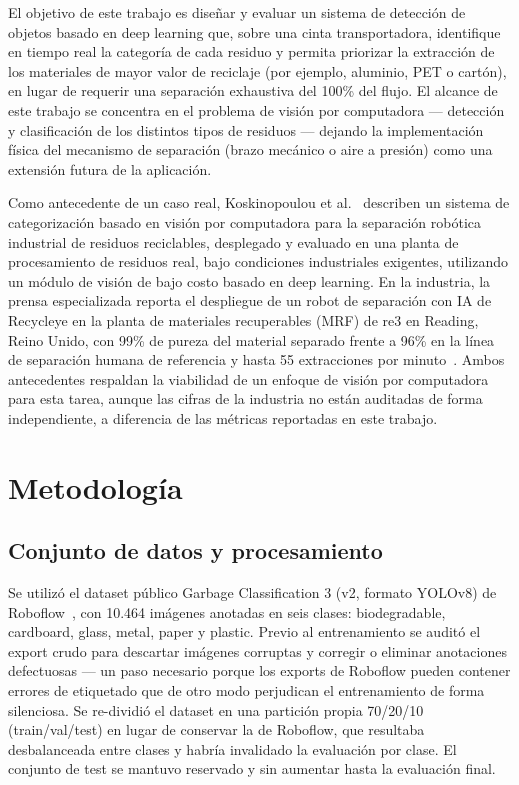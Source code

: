 \documentclass[conference]{IEEEtran}
\begin{document}
El objetivo de este trabajo es dise\~nar y evaluar un sistema de detecci\'on de objetos basado
en deep learning que, sobre una cinta transportadora, identifique en tiempo real la categor\'ia
de cada residuo y permita priorizar la extracci\'on de los materiales de mayor valor de
reciclaje (por ejemplo, aluminio, PET o cart\'on), en lugar de requerir una separaci\'on
exhaustiva del 100\% del flujo. El alcance de este trabajo se concentra en el problema de
visi\'on por computadora --- detecci\'on y clasificaci\'on de los distintos tipos de residuos
--- dejando la implementaci\'on f\'isica del mecanismo de separaci\'on (brazo mec\'anico o aire
a presi\'on) como una extensi\'on futura de la aplicaci\'on.

Como antecedente de un caso real, Koskinopoulou et al.~\cite{koskinopoulou2021} describen un
sistema de categorizaci\'on basado en visi\'on por computadora para la separaci\'on rob\'otica
industrial de residuos reciclables, desplegado y evaluado en una planta de procesamiento de
residuos real, bajo condiciones industriales exigentes, utilizando un m\'odulo de visi\'on de
bajo costo basado en deep learning. En la industria, la prensa especializada reporta el
despliegue de un robot de separaci\'on con IA de Recycleye en la planta de materiales
recuperables (MRF) de re3 en Reading, Reino Unido, con 99\% de pureza
del material separado frente a 96\% en la l\'inea de separaci\'on humana de referencia y hasta
55 extracciones por minuto~\cite{recycleye2022}. Ambos antecedentes respaldan la viabilidad de
un enfoque de visi\'on por computadora para esta tarea, aunque las cifras de la industria no
est\'an auditadas de forma independiente, a diferencia de las m\'etricas reportadas en este
trabajo.

\section{Metodolog\'ia}

\subsection{Conjunto de datos y procesamiento}

Se utiliz\'o el dataset p\'ublico Garbage Classification 3 (v2, formato YOLOv8) de
Roboflow~\cite{roboflow2024}, con 10.464 im\'agenes anotadas en seis clases: biodegradable,
cardboard, glass, metal, paper y plastic. Previo al entrenamiento se audit\'o el export crudo
para descartar im\'agenes corruptas y corregir o eliminar anotaciones defectuosas --- un paso
necesario porque los exports de Roboflow pueden contener errores de etiquetado que de otro
modo perjudican el entrenamiento de forma silenciosa. Se re-dividi\'o el dataset en una
partici\'on propia 70/20/10 (train/val/test) en lugar de conservar la de Roboflow, que
resultaba desbalanceada entre clases y habr\'ia invalidado la evaluaci\'on por clase. El
conjunto de test se mantuvo reservado y sin aumentar hasta la evaluaci\'on final.
\end{document}
